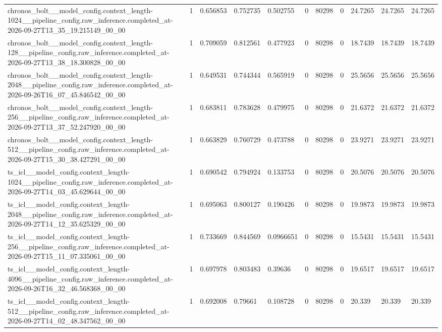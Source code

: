 \begin{tabular}{lllllllllll}
chronos\_bolt\_\_model\_config.context\_length-1024\_\_pipeline\_config.raw\_inference.completed\_at-2026-09-27T13\_35\_19.215149\_00\_00 & 1 & 0.656853 & 0.752735 & 0.502755 & 0 & 80298 & 0 & 24.7265 & 24.7265 & 24.7265 \\
chronos\_bolt\_\_model\_config.context\_length-128\_\_pipeline\_config.raw\_inference.completed\_at-2026-09-27T13\_38\_18.300828\_00\_00 & 1 & 0.709059 & 0.812561 & 0.477923 & 0 & 80298 & 0 & 18.7439 & 18.7439 & 18.7439 \\
chronos\_bolt\_\_model\_config.context\_length-2048\_\_pipeline\_config.raw\_inference.completed\_at-2026-09-26T16\_07\_45.846542\_00\_00 & 1 & 0.649531 & 0.744344 & 0.565919 & 0 & 80298 & 0 & 25.5656 & 25.5656 & 25.5656 \\
chronos\_bolt\_\_model\_config.context\_length-256\_\_pipeline\_config.raw\_inference.completed\_at-2026-09-27T13\_37\_52.247920\_00\_00 & 1 & 0.683811 & 0.783628 & 0.479975 & 0 & 80298 & 0 & 21.6372 & 21.6372 & 21.6372 \\
chronos\_bolt\_\_model\_config.context\_length-512\_\_pipeline\_config.raw\_inference.completed\_at-2026-09-27T15\_30\_38.427291\_00\_00 & 1 & 0.663829 & 0.760729 & 0.473788 & 0 & 80298 & 0 & 23.9271 & 23.9271 & 23.9271 \\
ts\_icl\_\_model\_config.context\_length-1024\_\_pipeline\_config.raw\_inference.completed\_at-2026-09-27T14\_03\_45.629644\_00\_00 & 1 & 0.690542 & 0.794924 & 0.133753 & 0 & 80298 & 0 & 20.5076 & 20.5076 & 20.5076 \\
ts\_icl\_\_model\_config.context\_length-2048\_\_pipeline\_config.raw\_inference.completed\_at-2026-09-27T14\_12\_35.625329\_00\_00 & 1 & 0.695063 & 0.800127 & 0.190426 & 0 & 80298 & 0 & 19.9873 & 19.9873 & 19.9873 \\
ts\_icl\_\_model\_config.context\_length-256\_\_pipeline\_config.raw\_inference.completed\_at-2026-09-27T15\_11\_07.335061\_00\_00 & 1 & 0.733669 & 0.844569 & 0.0966651 & 0 & 80298 & 0 & 15.5431 & 15.5431 & 15.5431 \\
ts\_icl\_\_model\_config.context\_length-4096\_\_pipeline\_config.raw\_inference.completed\_at-2026-09-26T16\_32\_46.568368\_00\_00 & 1 & 0.697978 & 0.803483 & 0.39636 & 0 & 80298 & 0 & 19.6517 & 19.6517 & 19.6517 \\
ts\_icl\_\_model\_config.context\_length-512\_\_pipeline\_config.raw\_inference.completed\_at-2026-09-27T14\_02\_48.347562\_00\_00 & 1 & 0.692008 & 0.79661 & 0.108728 & 0 & 80298 & 0 & 20.339 & 20.339 & 20.339 \\

\end{tabular}
